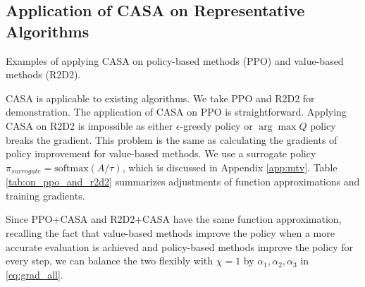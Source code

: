\subsection{Application of CASA on Representative Algorithms}
\label{sec:on_ppo_and_r2d2}

\begin{table}[ht!]
    \centering
    \caption{Examples of applying CASA on policy-based methods (PPO) and value-based methods (R2D2).}
    \label{tab:on_ppo_and_r2d2}
    \vskip -0.1in
\end{table}

CASA is applicable to existing algorithms. 
We take PPO and R2D2 for demonstration. 
The application of CASA on PPO is straightforward. 
Applying CASA on R2D2 is impossible as either $\epsilon$-greedy policy or $\arg\max Q$ policy breaks the gradient. 
This problem is the same as calculating the gradients of policy improvement for value-based methods.
We use a surrogate policy $\pi_{surrogate} = \text{softmax}(A / \tau)$, which is discussed in Appendix \ref{app:mtv}. 
Table \ref{tab:on_ppo_and_r2d2} summarizes adjustments of function approximations and training gradients. 

Since PPO+CASA and R2D2+CASA have the same function approximation, recalling the fact that value-based methods improve the policy when a more accurate evaluation is achieved and policy-based methods improve the policy for every step, we can balance the two flexibly with $\chi=1$ by $\alpha_1, \alpha_2, \alpha_3$ in \eqref{eq:grad_all}.

